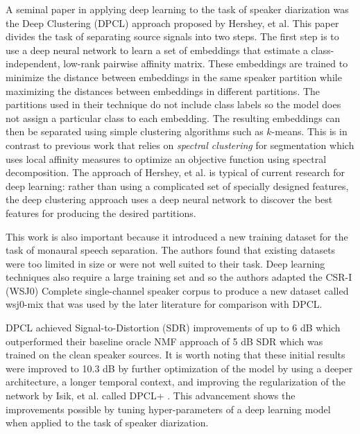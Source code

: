\documentclass[journal, a4paper]{IEEEtran}
\begin{document}
A seminal paper in applying deep learning to the task of speaker diarization was the Deep Clustering (DPCL) \cite{DBLP:journals/corr/HersheyCRW15} approach proposed by Hershey, et al. This paper divides the task of separating source signals into two steps. The first step is to use a deep neural network to learn a set of embeddings that estimate a class-independent, low-rank pairwise affinity matrix. These embeddings are trained to minimize the distance between embeddings in the same speaker partition while maximizing the distances between embeddings in different partitions. The partitions used in their technique do not include class labels so the model does not assign a particular class to each embedding. The resulting embeddings can then be separated using simple clustering algorithms such as $k$-means. This is in contrast to previous work that relies on \textit{spectral clustering} for segmentation which uses local affinity measures to optimize an objective function using spectral decomposition. The approach of Hershey, et al. is typical of current research for deep learning: rather than using a complicated set of specially designed features, the deep clustering approach uses a deep neural network to discover the best features for producing the desired partitions.

This work is also important because it introduced a new training dataset for the task of monaural speech separation. The authors found that existing datasets were too limited in size or were not well suited to their task. Deep learning techniques also require a large training set and so the authors adapted the CSR-I (WSJ0) Complete \cite{garofolo:wsj0} single-channel speaker corpus to produce a new dataset called wsj0-mix \cite{wsjmix} that was used by the later literature for comparison with DPCL.

DPCL achieved Signal-to-Distortion (SDR) improvements of up to 6 dB which outperformed their baseline oracle NMF approach of 5 dB SDR which was trained on the clean speaker sources. It is worth noting that these initial results were improved to 10.3 dB by further optimization of the model by using a deeper architecture, a longer temporal context, and improving the regularization of the network by Isik, et al. called DPCL+ \cite{DBLP:journals/corr/IsikRCWH16}. This advancement shows the improvements possible by tuning hyper-parameters of a deep learning model when applied to the task of speaker diarization.
\end{document}
